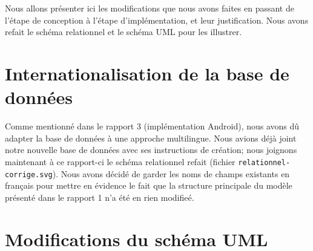 \documentclass[a4paper,10pt]{article}
\begin{document}

Nous allons présenter ici les modifications que nous avons faites en passant de l'étape de conception à l'étape d'implémentation, et leur justification. Nous avons refait le schéma relationnel et le schéma UML pour les illustrer.

\section{Internationalisation de la base de données}

Comme mentionné dans le rapport 3 (implémentation Android), nous avons dû adapter la base de données à une approche multilingue.
Nous avions déjà joint notre nouvelle base de données avec ses instructions de création; nous joignons maintenant à ce rapport-ci le schéma relationnel refait (fichier \texttt{relationnel-corrige.svg}). Nous avons décidé de garder les noms de champs existants en français pour mettre en évidence le fait que la structure principale du modèle présenté dans le rapport 1 n'a été en rien modifieé.

\section{Modifications du schéma UML}
\end{document}
